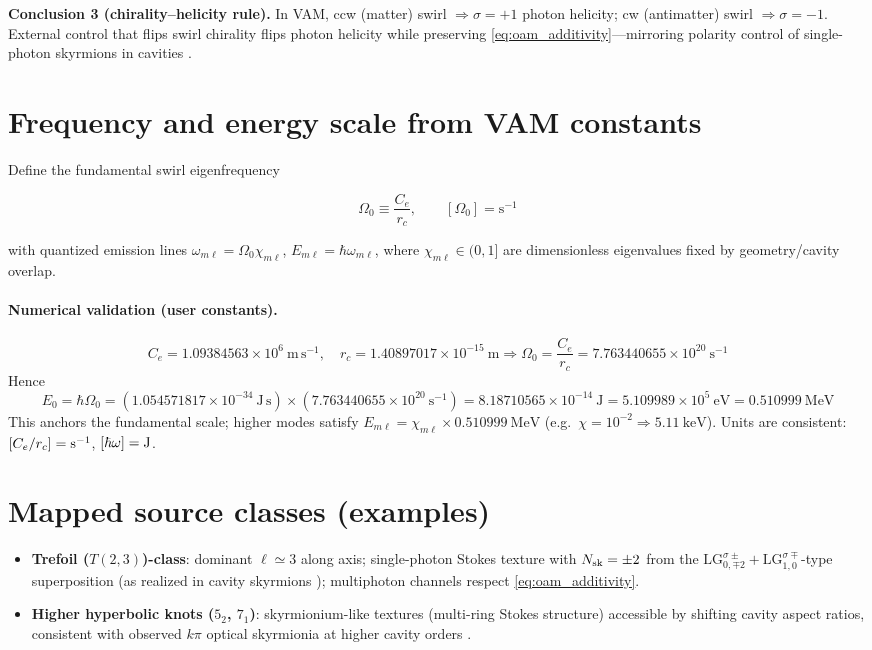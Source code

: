 \documentclass[12pt]{article}
\begin{document}
\textbf{Conclusion 3 (chirality--helicity rule).} In VAM, ccw (matter) swirl $\Rightarrow \sigma=+1$ photon helicity; cw (antimatter) swirl $\Rightarrow \sigma=-1$. External control that flips swirl chirality flips photon helicity while preserving \eqref{eq:oam_additivity}---mirroring polarity control of single-photon skyrmions in cavities \cite{Ma2025NanoPhotonSkyrmions}.

\section{Frequency and energy scale from VAM constants}

Define the fundamental swirl eigenfrequency

\begin{equation}
\boxed{\Omega_{0} \equiv \frac{C_{e}}{r_{c}}}, \qquad [\Omega_0] = \mathrm{s^{-1}}
\label{eq:Omega0}
\end{equation}

with quantized emission lines $\omega_{m\ell}=\Omega_{0}\chi_{m\ell}$, $E_{m\ell}=\hbar\omega_{m\ell}$, where $\chi_{m\ell}\in(0,1]$ are dimensionless eigenvalues fixed by geometry/cavity overlap.

\paragraph{Numerical validation (user constants).}

\[
C_{e} = 1.09384563 \times 10^{6}\ \mathrm{m\,s^{-1}},\quad
r_{c} = 1.40897017 \times 10^{-15}\ \mathrm{m} \Rightarrow
\Omega_{0} = \frac{C_{e}}{r_{c}} = 7.763440655 \times 10^{20}\ \mathrm{s^{-1}}
\]
Hence
\[
E_{0} = \hbar\Omega_{0}
= (1.054571817\times 10^{-34}\ \mathrm{J\,s})\times(7.763440655\times 10^{20}\ \mathrm{s^{-1}})
=8.18710565\times10^{-14}\ \mathrm{J}
= 5.109989 \times 10^{5}\ \mathrm{eV} = 0.510999\ \mathrm{MeV}
\]
This anchors the fundamental scale; higher modes satisfy $E_{m\ell}=\chi_{m\ell}\times 0.510999\ \mathrm{MeV}$ (e.g.\ $\chi=10^{-2}\Rightarrow 5.11\ \mathrm{keV}$). Units are consistent: $[C_{e}/r_{c}]={\rm s^{-1}}$, $[\hbar\omega]={\rm J}$.

\section{Mapped source classes (examples)}

\begin{itemize}
\item \textbf{Trefoil ($T(2,3)$)-class}: dominant $\ell \simeq 3$ along axis; single-photon Stokes texture with $N_{\rm sk} = \pm 2$ from the $\mathrm{LG}_{0,\mp 2}^{\sigma\pm} + \mathrm{LG}_{1,0}^{\sigma\mp}$-type superposition (as realized in cavity skyrmions \cite{Ma2025NanoPhotonSkyrmions}); multiphoton channels respect \eqref{eq:oam_additivity}.
\item \textbf{Higher hyperbolic knots ($5_2$, $7_1$)}: skyrmionium-like textures (multi-ring Stokes structure) accessible by shifting cavity aspect ratios, consistent with observed $k\pi$ optical skyrmionia at higher cavity orders \cite{Ma2025NanoPhotonSkyrmions}.
\end{itemize}
\end{document}
